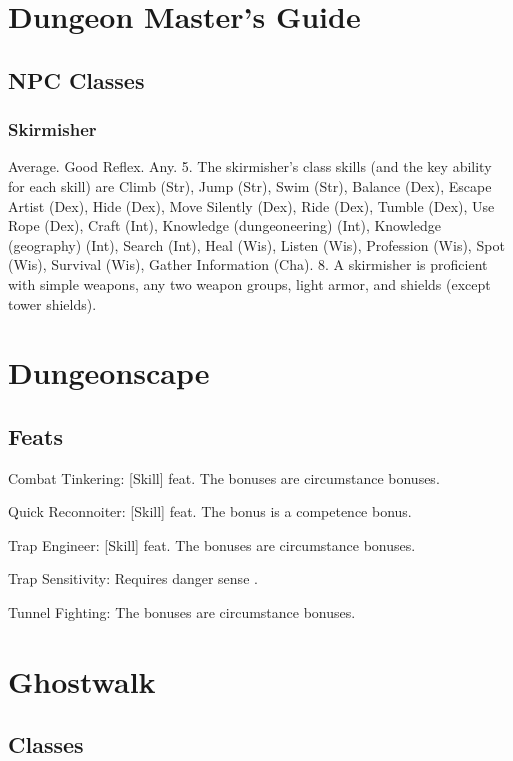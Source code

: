 \section{Dungeon Master's Guide}
\subsection{NPC Classes}
\subsubsection{Skirmisher}
 Average.
 Good Reflex.
 Any.
 5.
 The skirmisher's class skills (and the key ability for each skill) are Climb (Str), Jump (Str), Swim (Str), Balance (Dex), Escape Artist (Dex), Hide (Dex), Move Silently (Dex), Ride (Dex), Tumble (Dex), Use Rope (Dex), Craft (Int), Knowledge (dungeoneering) (Int), Knowledge (geography) (Int), Search (Int), Heal (Wis), Listen (Wis), Profession (Wis), Spot (Wis), Survival (Wis), Gather Information (Cha).
 8.
 A skirmisher is proficient with simple weapons, any two weapon groups, light armor, and shields (except tower shields).

\section{Dungeonscape}
\subsection{Feats}
\begin{itemize*}
\item Combat Tinkering: [Skill] feat. The bonuses are circumstance bonuses.
\item Quick Reconnoiter: [Skill] feat. The bonus is a competence bonus.
\item Trap Engineer: [Skill] feat. The bonuses are circumstance bonuses.
\item Trap Sensitivity: Requires danger sense .
\item Tunnel Fighting: The bonuses are circumstance bonuses.
\end{itemize*}

\section{Ghostwalk}
\subsection{Classes}
